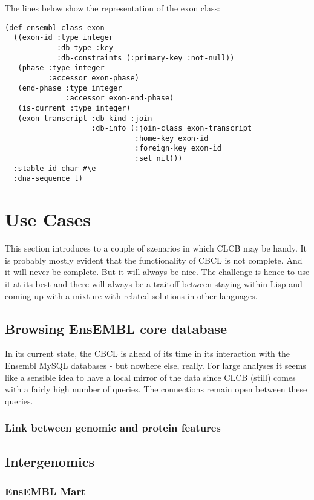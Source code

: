 \documentclass{book}
\newcommand\ensembl{EnsEMBL }
\newcommand\CLCB{CLCB }
\begin{document}
The lines below show the representation of the exon class:
\begin{lstlisting}
(def-ensembl-class exon
  ((exon-id :type integer
            :db-type :key
            :db-constraints (:primary-key :not-null))
   (phase :type integer
          :accessor exon-phase)
   (end-phase :type integer
              :accessor exon-end-phase)
   (is-current :type integer)
   (exon-transcript :db-kind :join
                    :db-info (:join-class exon-transcript
                              :home-key exon-id
                              :foreign-key exon-id
                              :set nil)))
  :stable-id-char #\e
  :dna-sequence t)
\end{lstlisting}


\chapter{Use Cases}

This section introduces to a couple of szenarios in which \CLCB may
be handy. It is probably mostly evident that the functionality of CBCL
is not complete. And it will never be complete. But it will always be
nice. The challenge is hence to use it at its best and there will always
be a traitoff between staying within Lisp and coming up with a mixture
with related solutions in other languages.

\section{Browsing \ensembl core database}

In its current state, the CBCL is ahead of its time in its interaction with
the Ensembl MySQL databases - but nowhere else, really. For large analyses
it seems like a sensible idea to have a local mirror of the data since
\CLCB (still) comes with a fairly high number of queries. The connections
remain open between these queries.

\subsection{Link between genomic and protein features}

\section{Intergenomics}

\subsection{\ensembl Mart}
\end{document}
